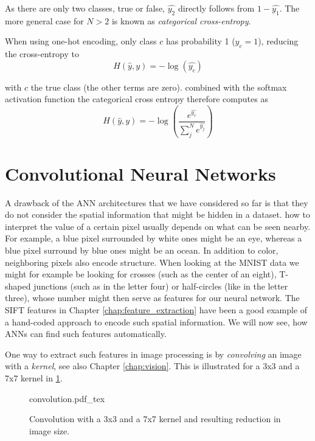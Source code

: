 As there are only two classes, true or false, $\hat{y_2}$ directly follows from $1-\hat{y_1}$. 
The more general case for $N>2$ is known as \textsl{categorical cross-entropy}.

When using one-hot encoding, only class $c$ has probability 1 ($y_c=1$), reducing the cross-entropy to 
\begin{equation}
H(\hat{y},y)=-\log(\hat{y_c})
\end{equation}

with $c$ the true class (the other terms are zero). 
combined with the softmax activation function the categorical cross entropy therefore computes as
\begin{equation}
H(\hat{y},y) = -\log\left(\frac{e^{\hat{y_c}}}{\sum_{j}^N e^{\hat{y_j}}}\right)
\end{equation}


\section{Convolutional Neural Networks}
A drawback of the ANN architectures that we have considered so far is that they do not consider the spatial information that might be hidden in a dataset. 
 how to interpret the value of a certain pixel usually depends on what can be seen nearby. For example, a blue pixel surrounded by white ones might be an eye, whereas a blue pixel surround by blue ones might be an ocean. In addition to color, neighboring pixels also encode structure. When looking at the MNIST  data we might for example be looking for crosses (such as the center of an eight), T-shaped junctions (such as in the letter four) or half-circles (like in the letter three), whose number might then serve as features for our neural network. The SIFT features in Chapter \ref{chap:feature_extraction} have been a good example of a hand-coded approach to encode such spatial information. We will now see, how ANNs can find such features automatically.

One way to extract such features in image processing is by \textsl{convolving} an image with a \textsl{kernel}, see also Chapter \ref{chap:vision}. This is illustrated for a 3x3 and a 7x7 kernel in \cref{fig:convolution}.


\begin{figure}[htb]
    \centering
    \def\svgwidth{0.8\textwidth}
    {convolution.pdf_tex}
    \caption{Convolution with a 3x3 and a 7x7 kernel and resulting reduction in image size.\label{fig:convolution}}
\end{figure}

